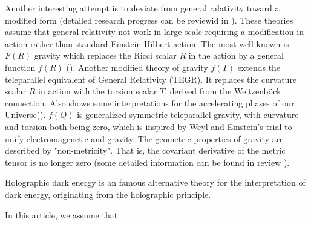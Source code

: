 \documentclass[linenumbers]{aastex631}
\begin{document}
Another interesting attempt is to deviate from general ralativity toward a modified form (detailed research progress can be reviewid in \cite{Clifton_2012}). These theories assume that general relativity not work in large scale requiring a modification in action rather than standard Einstein-Hilbert action. The most well-known is $F(R)$ gravity which replaces the Ricci scalar $R$ in the action by a general function $f(R)$ (\cite{1970MNRAS.150....1B}). Another modified theory of gravity $f(T)$ extends the teleparallel equivalent of General Relativity (TEGR). It replaces the curvature scalar $R$ in action with the torsion scalar $T$, derived from the Weitzenböck connection. Also shows some interpretations for the accelerating phases of our Universe(\cite{Cai_2016,Bengochea_2009}). $f(Q)$ is generalized symmetric teleparallel gravity, with curvature and torsion both being zero, which is inspired by Weyl and Einstein's trial to unify electromagenetic and gravity. The geometric properties of gravity are described by "non-metricity". That is, the covariant derivative of the metric tensor is no longer zero (some detailed information can be found in review \cite{HEISENBERG20241}).

Holographic dark energy is an famous alternative theory for the interpretation of dark energy, originating from the holographic principle.

In this article, we assume that
\end{document}
